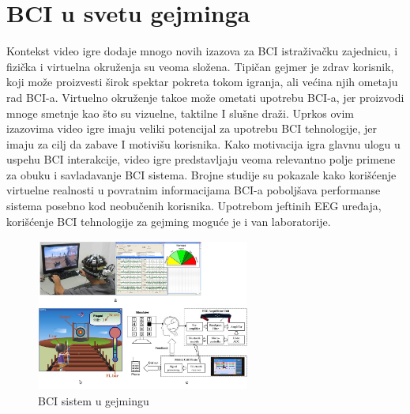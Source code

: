 \documentclass[conference]{IEEEtran}
\begin{document}
\section{BCI u svetu gejminga}
Kontekst video igre dodaje mnogo novih izazova za BCI istraživačku zajednicu, i fizička i virtuelna okruženja su veoma složena. Tipičan gejmer je zdrav korisnik, koji može proizvesti širok spektar pokreta tokom igranja, ali većina njih ometaju rad BCI-a. Virtuelno okruženje tako\dj e može ometati upotrebu BCI-a, jer proizvodi mnoge smetnje kao što su vizuelne, taktilne I slušne draži.  Uprkos ovim izazovima video igre imaju veliki potencijal za upotrebu BCI tehnologije, jer imaju za cilj da zabave I motivišu korisnika. Kako motivacija igra glavnu ulogu u uspehu BCI interakcije, video igre predstavljaju veoma relevantno polje primene za obuku i savladavanje BCI sistema. Brojne studije su pokazale kako korišćenje virtuelne realnosti u povratnim informacijama BCI-a poboljšava performanse sistema posebno kod neobučenih korisnika. Upotrebom jeftinih EEG uređaja, korišćenje BCI tehnologije za gejming moguće je i van laboratorije.\\
\begin{figure}[htp]
\centerline{\includegraphics[width=7cm, height=5cm]{image4.jpg}}
\caption{BCI sistem u gejmingu}
\label{Slika}
\end{figure}
\end{document}
